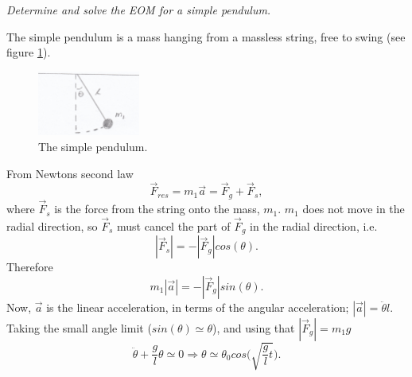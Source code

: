 \begin{example}
	\emph{Determine and solve the EOM for a simple pendulum.}\newline
	
	The simple pendulum is a mass hanging from a massless string, free to swing (see figure \ref{fig:pen}).
	\begin{figure}[H]
		\captionsetup{width=1\textwidth}
		\centering
		\includegraphics[width=0.3\textwidth]{figures/pen}
		\caption{The simple pendulum.}
		\label{fig:pen}
	\end{figure}
	From Newtons second law
	\begin{equation}
		\vec{F}_{res}=m_1\vec{a}
		=\vec{F}_g+\vec{F}_s,
	\end{equation} 
	where $\vec{F}_s$ is the force from the string onto the mass, $m_1$. $m_1$ does not move in the radial direction, so $\vec{F}_s$ must cancel the part of $\vec{F}_g$ in the radial direction,  i.e.
	\begin{equation}
		|\vec{F}_s|=-|\vec{F}_g|cos(\theta).
	\end{equation} 
	Therefore
	\begin{equation}
		m_1|\vec{a}|=-|\vec{F}_g|sin(\theta).
	\end{equation} 
	Now, $\vec{a}$ is the linear acceleration, in terms of the angular acceleration; $|\vec{a}|=\ddot{\theta}l$. Taking the small angle limit ($sin(\theta)\simeq \theta$), and using that $|\vec{F}_g|=m_1g$
	\begin{equation}
		\ddot{\theta}+\frac{g}{l}\theta\simeq 0\Rightarrow \theta\simeq \theta_0cos\bigg(\sqrt{\frac{g}{l}t}\bigg).
	\end{equation} 
	
\end{example}

